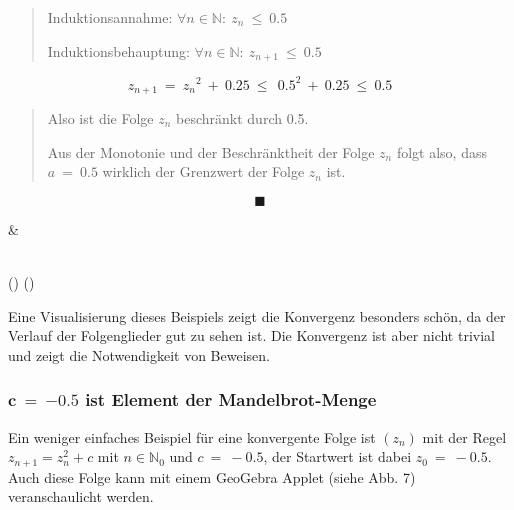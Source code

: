 \documentclass[a4paper, 12pt]{book}
\begin{document}
\begin{longtable}[]
\begin{minipage}[b]{\linewidth}
\begin{quote}
Induktionsannahme: \(\forall n \in \mathbb{N:\ }z_{n}\  \leq \ 0.5\)

Induktionsbehauptung:
\(\forall n \in \mathbb{N:\ }z_{n + 1}\  \leq \ 0.5\)
\end{quote}

\[z_{n + 1}\  = \ {z_{n}}^{2}\  + \ 0.25\  \leq \ \ {0.5}^{2}\  + \ 0.25\  \leq \ 0.5\]

\begin{quote}
Also ist die Folge \(z_{n}\) beschränkt durch 0.5.

Aus der Monotonie und der Beschränktheit der Folge \(z_{n}\) folgt also,
dass \(a\  = \ 0.5\) wirklich der Grenzwert der Folge \(z_{n}\) ist.
\end{quote}

\[\blacksquare\]
\end{minipage} & \begin{minipage}[b]{\linewidth}\raggedright
\end{minipage} \\
\midrule()
\endhead
\bottomrule()
\end{longtable}

Eine Visualisierung dieses Beispiels zeigt die Konvergenz besonders
schön, da der Verlauf der Folgenglieder gut zu sehen ist. Die Konvergenz
ist aber nicht trivial und zeigt die Notwendigkeit von Beweisen.

\hypertarget{mathbfc-mathbf-mathbf0.5-ist-element-der-mandelbrot-menge}{%
\subsubsection{\texorpdfstring{\(\mathbf{c\  = \ }\mathbf{-}\mathbf{0.5}\)
ist Element der
Mandelbrot-Menge}{\textbackslash mathbf\{c\textbackslash{}  = \textbackslash{} \}\textbackslash mathbf\{-\}\textbackslash mathbf\{0.5\} ist Element der Mandelbrot-Menge}}\label{mathbfc-mathbf-mathbf0.5-ist-element-der-mandelbrot-menge}}

Ein weniger einfaches Beispiel für eine konvergente Folge ist
\(\left( z_{n} \right)\) mit der Regel \(z_{n + 1} = z_{n}^{2} + c\) mit
\(n \in \mathbb{N}_{0}\) und \(c\  = \  - 0.5\), der Startwert ist dabei
\(z_{0}\  = \  - 0.5\). Auch diese Folge kann mit einem GeoGebra Applet
(siehe Abb. 7) veranschaulicht werden.
\end{document}
